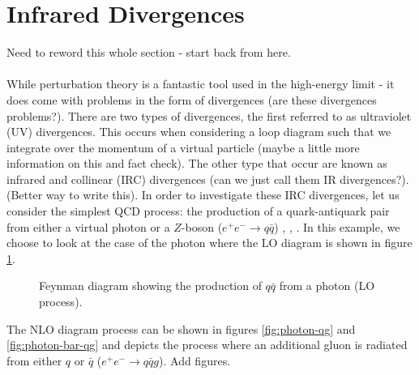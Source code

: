 \section{Infrared Divergences}
{\color{blue} Need to reword this whole section - start back from here.} \\ \\ 
While perturbation theory is a fantastic tool used in the high-energy limit - it does come with problems in the form of divergences{\color{blue} (are these divergences problems?)}. There are two types of divergences, the first referred to as ultraviolet (UV) divergences. This occurs when considering a loop diagram such that we integrate over the momentum of a virtual particle {\color{blue} (maybe a little more information on this and fact check)}. The other type that occur are known as infrared and collinear (IRC) divergences {\color{blue} (can we just call them IR divergences?)}. {\color{blue} (Better way to write this).} In order to investigate these IRC divergences, let us consider the simplest QCD process: the production of a quark-antiquark pair from either a virtual photon or a $Z$-boson ($e^+e^-\rightarrow q\bar{q}$) \cite{Luisoni:2015xha}, \cite{McAslan:2017bqp}, \cite{Arpino:2020smn}. In this example, we choose to look at the case of the photon where the LO diagram is shown in figure \ref{fig:photon-qq}. 
\begin{figure}[h]
    \centering
    \caption{Feynman diagram showing the production of $q\bar{q}$ from a photon (LO process).}
    \label{fig:photon-qq}
\end{figure}
The NLO diagram process can be shown in figures \ref{fig:photon-qg} and \ref{fig:photon-bar-qg} and depicts the process where an additional gluon is radiated from either  $q$ or $\bar{q}$ ($e^+e^-\rightarrow q\bar{q}g$). 
{\color{green} Add figures.}


